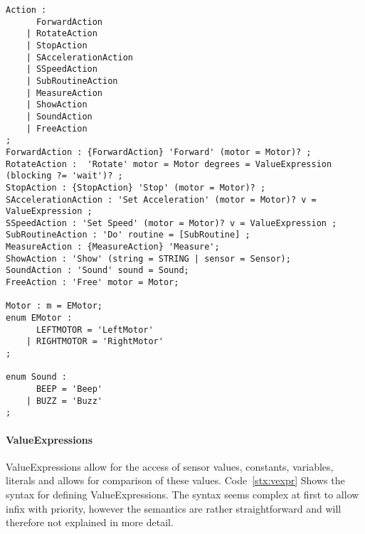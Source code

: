 \begin{lstlisting}[caption=Syntax for actions, label=stx:actions]
Action : 
      ForwardAction
    | RotateAction
    | StopAction
    | SAccelerationAction
    | SSpeedAction
    | SubRoutineAction
    | MeasureAction
    | ShowAction
    | SoundAction
    | FreeAction
;
ForwardAction : {ForwardAction} 'Forward' (motor = Motor)? ;
RotateAction :  'Rotate' motor = Motor degrees = ValueExpression (blocking ?= 'wait')? ; 
StopAction : {StopAction} 'Stop' (motor = Motor)? ;
SAccelerationAction : 'Set Acceleration' (motor = Motor)? v = ValueExpression ;
SSpeedAction : 'Set Speed' (motor = Motor)? v = ValueExpression ;
SubRoutineAction : 'Do' routine = [SubRoutine] ;
MeasureAction : {MeasureAction} 'Measure';
ShowAction : 'Show' (string = STRING | sensor = Sensor);
SoundAction : 'Sound' sound = Sound;
FreeAction : 'Free' motor = Motor;

Motor : m = EMotor;
enum EMotor :
      LEFTMOTOR = 'LeftMotor'
    | RIGHTMOTOR = 'RightMotor'
;

enum Sound : 
      BEEP = 'Beep'
    | BUZZ = 'Buzz'
;
\end{lstlisting}

\paragraph{ValueExpressions} ValueExpressions allow for the access of sensor 
values, constants, variables, literals and allows for comparison of these
values. Code~\ref{stx:vexpr} Shows the syntax for defining ValueExpressions.
The syntax seems complex at first to allow infix with 
priority, however the semantics are rather straightforward and will therefore
not explained in more detail.

